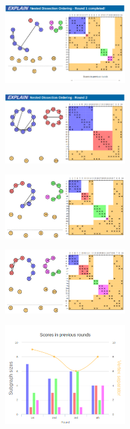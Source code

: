 \documentclass[12pt, oneside]{book}
\begin{document}
\begin{figure}
\centering
\includegraphics[width=0.47\textwidth]{bad_disection}
\caption{}
\label{bad_disection}
\end{figure}

\begin{figure}
\centering
\includegraphics[width=0.47\textwidth]{good_bisection}
\caption{}
\label{good_bisection}
\end{figure}

\begin{figure}
\centering
\includegraphics[width=0.47\textwidth]{good_disection}
\caption{}
\label{good_disection}
\end{figure}

\begin{figure}
\centering
\includegraphics[width=0.47\textwidth]{good_disection2}
\caption{}
\label{good_disection2}
\end{figure}


\begin{figure}
\centering
\includegraphics[width=0.47\textwidth]{chart2}
\caption{}
\label{barchart}
\end{figure}
\end{document}
